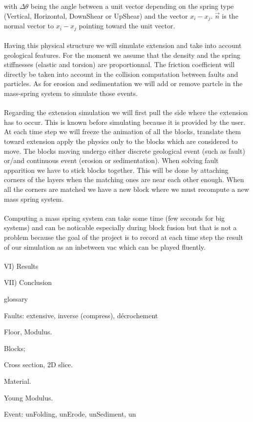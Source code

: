 \documentclass[12pt, a4paper]{memoir} %
\begin{document}
with $\Delta \theta$ being the angle between a unit vector depending on the spring type (Vertical, Horizontal, DownShear or UpShear) and the vector $x_i - x_j$. $\vec{n}$ is the normal vector to $x_i - x_j$ pointing toward the unit vector.\\\\
Having this physical structure we will simulate extension and take into account geological features. For the moment we assume that the density and the spring stiffnesses (elastic and torsion) are proportionnal. The friction coefficient will directly be taken into account in the collision computation between faults and particles. As for erosion and sedimentation we will add or remove partcle in the mass-spring system to simulate those events.\\\\
Regarding the extension simulation we will first pull the side where the extension has to occur. This is known before simulating because it is provided by the user. At each time step we will freeze the animation of all the blocks, translate them toward extension apply the physics only to the blocks which are considered to move. The blocks moving undergo either discrete geological event (such as fault) or/and continuous event (erosion or sedimentation). When solving fault apparition we have to stick blocks together. This will be done by attaching corners of the layers when the matching ones are near each other enough. When all the corners are matched we have a new block where we must recompute a new mass spring system.\\\\
Computing a mass spring system can take some time (few seconds for big systems) and can be noticable especially during block fusion but that is not a problem because the goal of the project is to record at each time step the result of our simulation as an inbetween vac which can be played fluently.\\\\


VI) Results

VII) Conclusion

glossary
	
Faults: extensive, inverse (compress), décrochement

Floor, Modulus.

Blocks;

Cross section, 2D slice.

Material.

Young Modulus.

Event: unFolding, unErode, unSediment, un



\end{document}
